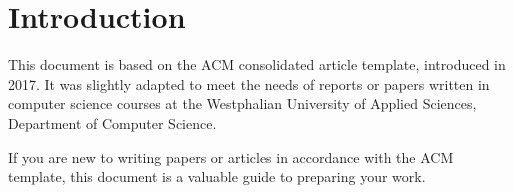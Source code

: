 \section{Introduction}
This document is based on the ACM consolidated article template, introduced in 2017. It was slightly adapted to meet the needs of reports or papers written in computer science courses at the Westphalian University of Applied Sciences, Department of Computer Science.

If you are new to writing papers or articles in accordance with the ACM template, this document is a valuable
guide to preparing your work.

